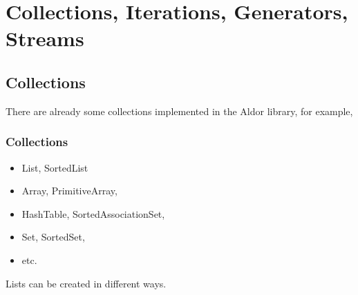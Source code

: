 \section{Collections, Iterations, Generators, Streams}
\subsection{Collections}

There are already some collections implemented in the Aldor library,
for example, 


\begin{frame}[fragile]
  \frametitle<presentation>{Collections}
\begin{itemize}
\item {List}, SortedList
\item {Array}, PrimitiveArray,
\item {HashTable}, SortedAssociationSet,
\item Set, SortedSet,
\item etc.
\end{itemize}
\end{frame}














Lists can be created in different ways.
\begin{myverbatim}
\end{myverbatim}

